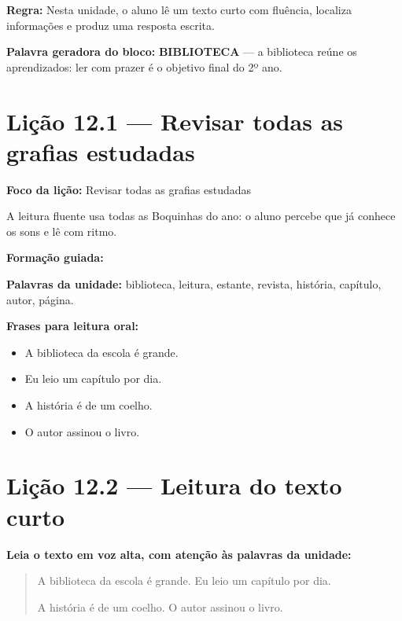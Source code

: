 \textbf{Regra:} Nesta unidade, o aluno lê um texto curto com fluência, localiza informações e produz uma resposta escrita.

\textbf{Palavra geradora do bloco:} \textbf{BIBLIOTECA} --- a biblioteca reúne os aprendizados: ler com prazer é o objetivo final do 2º ano.

\section{Lição 12.1 --- Revisar todas as grafias estudadas}

\textbf{Foco da lição:} Revisar todas as grafias estudadas


\begin{boquinha}
A leitura fluente usa todas as Boquinhas do ano: o aluno percebe que já conhece os sons e lê com ritmo.
\end{boquinha}

\noindent\textbf{Formação guiada:}

\begin{center}
\end{center}

\noindent\textbf{Palavras da unidade:} biblioteca, leitura, estante, revista, história, capítulo, autor, página.

\noindent\textbf{Frases para leitura oral:}
\begin{itemize}[leftmargin=1.6em]
  \item A biblioteca da escola é grande.
  \item Eu leio um capítulo por dia.
  \item A história é de um coelho.
  \item O autor assinou o livro.
\end{itemize}

\section{Lição 12.2 --- Leitura do texto curto}

\noindent\textbf{Leia o texto em voz alta, com atenção às palavras da unidade:}


\begin{quote}
A biblioteca da escola é grande. Eu leio um capítulo por dia.

A história é de um coelho. O autor assinou o livro.
\end{quote}

